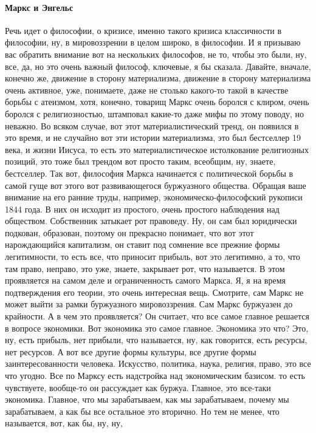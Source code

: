 \paragraph{Маркс и Энгельс}
Речь идет о философии, о кризисе, именно такого кризиса классичности в
философии, ну, в мировоззрении в целом широко, в философии. И я призываю вас
обратить внимание вот на нескольких философов, не то, чтобы это были, ну, все,
да, но это очень важный философ, ключевые, я бы сказала. Давайте, вначале,
конечно же, движение в сторону материализма, движение в сторону материализма
очень активное, уже, понимаете, даже не столько какого-то такой в качестве
борьбы с атеизмом, хотя, конечно, товарищ Маркс очень боролся с клиром, очень
боролся с религиозностью, штамповал какие-то даже мифы по этому поводу, но
неважно. Во всяком случае, вот этот материалистический тренд, он появился в это
время, и не случайно вот эти истории материализма, это был бестселлер 19 века, и
жизни Иисуса, то есть это материалистическое истолкование религиозных позиций,
это тоже был трендом вот просто таким, всеобщим, ну, знаете, бестселлер. Так
вот, философия Маркса начинается с политической борьбы в самой гуще вот этого
вот развивающегося буржуазного общества. Обращая ваше внимание на его ранние
труды, например, экономическо-философский рукописи 1844 года. В них он исходит
из простого, очень простого наблюдения над обществом. Собственник затыкает рот
правоведу. Ну, он сам был юридически подкован, образован, поэтому он прекрасно
понимает, что вот этот нарождающийся капитализм, он ставит под сомнение все
прежние формы легитимности, то есть все, что приносит прибыль, вот это
легитимно, а то, что там право, неправо, это уже, знаете, закрывает рот, что
называется. В этом проявляется на самом деле и ограниченность самого Маркса. Я,
я на время подтверждения его теории, это очень интересная вещь. Смотрите, сам
Маркс не может выйти за рамки буржуазного мировоззрения. Сам Маркс буржуазен до
крайности. А в чем это проявляется? Он считает, что все самое главное решается в
вопросе экономики. Вот экономика это самое главное. Экономика это что? Это, ну,
есть прибыль, нет прибыли, что называется, ну, как говорится, есть ресурсы, нет
ресурсов. А вот все другие формы культуры, все другие формы заинтересованности
человека. Искусство, политика, наука, религия, право, это все что угодно. Все по
Марксу есть надстройка над экономическим базисом. то есть чувствуете, вообще-то
он рассуждает как буржуа. Главное, это все-таки экономика. Главное, что мы
зарабатываем, как мы зарабатываем, почему мы зарабатываем, а как бы все
остальное это вторично. Но тем не менее, что называется, вот, как бы, ну, ну,
